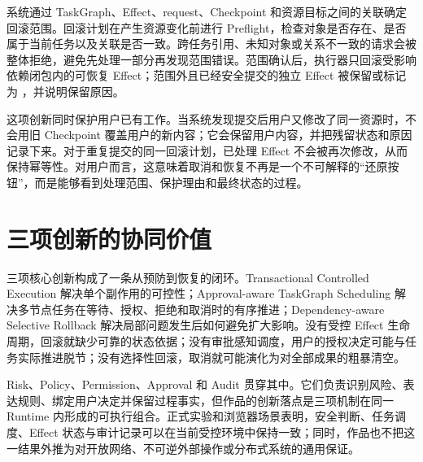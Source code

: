 系统通过 TaskGraph、Effect、request、Checkpoint 和资源目标之间的关联确定回滚范围。回滚计划在产生资源变化前进行 Preflight，检查对象是否存在、是否属于当前任务以及关联是否一致。跨任务引用、未知对象或关系不一致的请求会被整体拒绝，避免先处理一部分再发现范围错误。范围确认后，执行器只回滚受影响依赖闭包内的可恢复 Effect；范围外且已经安全提交的独立 Effect 被保留或标记为 ，并说明保留原因。

这项创新同时保护用户已有工作。当系统发现提交后用户又修改了同一资源时，不会用旧 Checkpoint 覆盖用户的新内容；它会保留用户内容，并把残留状态和原因记录下来。对于重复提交的同一回滚计划，已处理 Effect 不会被再次修改，从而保持幂等性。对用户而言，这意味着取消和恢复不再是一个不可解释的“还原按钮”，而是能够看到处理范围、保护理由和最终状态的过程。

\section{三项创新的协同价值}

三项核心创新构成了一条从预防到恢复的闭环。Transactional Controlled Execution 解决单个副作用的可控性；Approval-aware TaskGraph Scheduling 解决多节点任务在等待、授权、拒绝和取消时的有序推进；Dependency-aware Selective Rollback 解决局部问题发生后如何避免扩大影响。没有受控 Effect 生命周期，回滚就缺少可靠的状态依据；没有审批感知调度，用户的授权决定可能与任务实际推进脱节；没有选择性回滚，取消就可能演化为对全部成果的粗暴清空。

Risk、Policy、Permission、Approval 和 Audit 贯穿其中。它们负责识别风险、表达规则、绑定用户决定并保留过程事实，但作品的创新落点是三项机制在同一 Runtime 内形成的可执行组合。正式实验和浏览器场景表明，安全判断、任务调度、Effect 状态与审计记录可以在当前受控环境中保持一致；同时，作品也不把这一结果外推为对开放网络、不可逆外部操作或分布式系统的通用保证。
